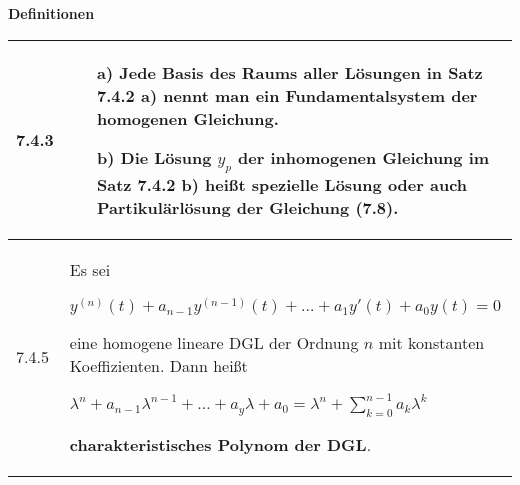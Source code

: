     \noindent
    \textbf{Definitionen}
    \begin{table}[H]  
    \begin{tabularx}{\textwidth}{X m{16cm}}
        \toprule

        7.4.3 & \begin{itemize}[topsep=-0.5cm]
                    \item[a)] Jede Basis des Raums aller Lösungen in Satz 7.4.2 a) nennt man ein Fundamentalsystem der homogenen Gleichung.
                    \item[b)] Die Lösung $y_p$ der inhomogenen Gleichung im Satz 7.4.2 b) heißt spezielle Lösung oder auch
                                \textbf{Partikulärlösung der Gleichung (7.8)}.
                \end{itemize} \vspace{-0cm} \\
        \midrule
        7.4.5 & Es sei \hfill \break
                \centerline{$ y^{(n)}(t) + a_{n-1}y^{(n-1)}(t) + \dots + a_1y'(t)+a_0y(t)=0 $}
                eine homogene lineare DGL der Ordnung $n$ mit konstanten Koeffizienten. Dann heißt \hfill \break
                \centerline{$ \lambda^n + a_{n-1}\lambda^{n-1}+ \dots + a_y \lambda+a_0 = \lambda^n + \sum^{n-1}_{k=0} a_k \lambda^k $} 
                \textbf{charakteristisches Polynom der DGL}. \\

        \bottomrule

    \end{tabularx}
    \end{table}

